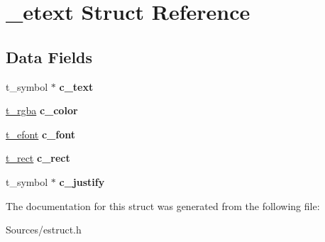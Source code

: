 \hypertarget{struct__etext}{\section{\-\_\-etext Struct Reference}
\label{struct__etext}
}
\subsection*{Data Fields}
\begin{DoxyCompactItemize}
\item 
\hypertarget{struct__etext_ac054c96b035a5f1a859bc8e46b636920}{t\-\_\-symbol $\ast$ {\bfseries c\-\_\-text}}\label{struct__etext_ac054c96b035a5f1a859bc8e46b636920}

\item 
\hypertarget{struct__etext_a8c9f65e6b5d93662d9b40a38b40a3a91}{\hyperlink{struct__rgba}{t\-\_\-rgba} {\bfseries c\-\_\-color}}\label{struct__etext_a8c9f65e6b5d93662d9b40a38b40a3a91}

\item 
\hypertarget{struct__etext_a5a04aa88bfa7e501cc22e79911ec6322}{\hyperlink{struct__efont}{t\-\_\-efont} {\bfseries c\-\_\-font}}\label{struct__etext_a5a04aa88bfa7e501cc22e79911ec6322}

\item 
\hypertarget{struct__etext_a3ad11827ad04fba1ba8cb1d853ad18dc}{\hyperlink{struct__rect}{t\-\_\-rect} {\bfseries c\-\_\-rect}}\label{struct__etext_a3ad11827ad04fba1ba8cb1d853ad18dc}

\item 
\hypertarget{struct__etext_a882eef71064831d5e3671b5a06cd0a1d}{t\-\_\-symbol $\ast$ {\bfseries c\-\_\-justify}}\label{struct__etext_a882eef71064831d5e3671b5a06cd0a1d}

\end{DoxyCompactItemize}


The documentation for this struct was generated from the following file\-:\begin{DoxyCompactItemize}
\item 
Sources/estruct.\-h\end{DoxyCompactItemize}
